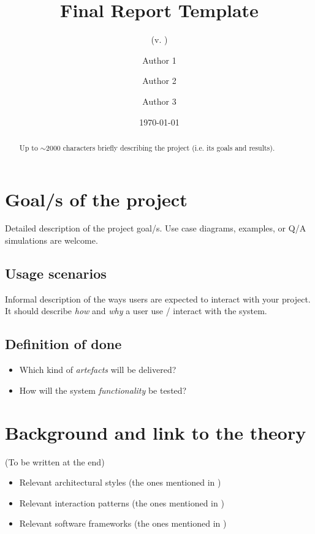 \documentclass{scrartcl}
\title{\LARGE
    Final Report Template
}
\subtitle{(v. \version)}
\author{
    Author 1 \\ \emailaddr{author1@email.it}
    \and 
    Author 2 \\ \emailaddr{author2@gmail.com} 
    \and 
    Author 3 \\ \emailaddr{author3@unibo.it}
}
\date{\today}
\begin{document}
\maketitle

\begin{abstract}
    Up to $\sim$2000 characters briefly describing the project (i.e. its goals and results).
\end{abstract}

\section{Goal/s of the project}

Detailed description of the project goal/s.
%
Use case diagrams, examples, or Q/A simulations are welcome.

\subsection{Usage scenarios}

Informal description of the ways users are expected to interact with your project.
%
It should describe \emph{how} and \emph{why} a user use / interact with the system.

\subsection{Definition of done}

\begin{itemize}
    \item Which kind of \emph{artefacts} will be delivered?
    \item How will the system \emph{functionality} be tested?
\end{itemize}

\section{Background and link to the theory}
%
(To be written at the end)
%
\begin{itemize}
    \item Relevant architectural styles (the ones mentioned in )
    \item Relevant interaction patterns (the ones mentioned in ) 
    \item Relevant software frameworks (the ones mentioned in ) 
\end{itemize}
\end{document}
